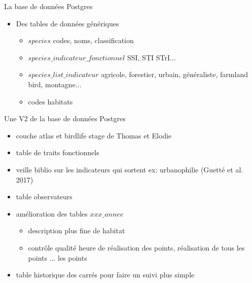 \documentclass[]{beamer}
\begin{document}
\begin{frame}{La base de données Postgres}
  \begin{itemize}[<+->]
   \item Des tables de données génériques
     \begin{itemize}
     \item $species$
       \newline codes, noms, classification
      \item $species\_indicateur\_fonctionnel$
        \newline SSI, STI STrI...
      \item $species\_list\_indicateur$
        \newline agricole, forestier, urbain, généraliste, farmland
        bird, montagne...
      \item codes habitats
         \end{itemize}
    \end{itemize}
  \end{frame}


  \begin{frame}{Une V2 de la base de données Postgres}
    \begin{itemize}[<+->]
    \item couche atlas et birdlife
      \newline stage de Thomas et Elodie
    \item table de traits fonctionnels
    \item veille biblio sur les indicateurs qui sortent
      \newline ex: urbanophilie (Guetté et al. 2017)
    \item table observateurs
    \item amélioration des tables $xxx\_annee$
      \begin{itemize}
      \item description plus fine de habitat
      \item contrôle qualité
        \newline heure de réalisation des points, réalisation de tous les points ...
        les points
      \end{itemize}
    \item table historique des carrés
      \newline pour faire un suivi plus simple
    \end{itemize}
  \end{frame}
\end{document}

